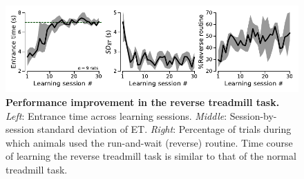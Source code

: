 \begin{figure}[h!]
	\begin{center}
		\includegraphics[scale=1]{ch-appendicies/figures/RevTrdLearning.pdf}
		\caption[Learning the Reverse Treadmill Task]
		{\textbf{Performance improvement in the reverse treadmill task.}
		\textit{Left}: Entrance time across learning sessions.
		\textit{Middle}: Session-by-session standard deviation of ET.
		\textit{Right}: Percentage of trials during which animals used the run-and-wait (reverse) routine.
		Time course of learning the reverse treadmill task is similar to that of the normal treadmill task.
		}
		\label{fig:appendix:revLearn}
	\end{center}
\end{figure}